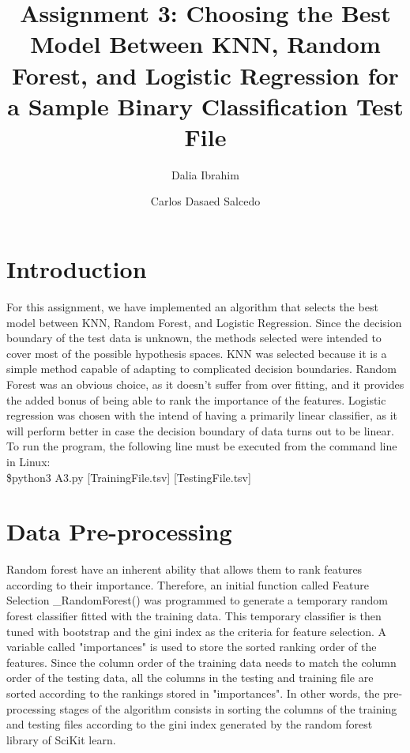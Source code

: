 \documentclass{article}
\author[1]{Dalia Ibrahim}
\author[2]{Carlos Dasaed Salcedo}
\affil[ ]{Studnet ID}
\affil[1]{201893217}
\affil[2]{201892008}
\begin{document}
  

\title{ Assignment 3: Choosing the Best Model Between KNN, Random Forest, and Logistic Regression for a Sample Binary Classification Test File}


\maketitle
 \section{Introduction}
For this assignment, we have implemented an algorithm that selects the best model between KNN, Random Forest, and Logistic Regression. Since the decision boundary of the test data is unknown, the methods selected were intended to cover most of the possible hypothesis spaces. KNN was selected because it is a simple method capable of adapting to complicated decision boundaries.  Random Forest was an obvious choice, as it doesn't suffer from over fitting, and it provides the added bonus of being able to rank the importance of the features. Logistic regression was chosen with the intend of having a primarily linear classifier, as it will perform better in case the decision boundary of data turns out to be linear. To run the program, the following line must be executed from the command line in Linux: \\
\$python3 A3.py [TrainingFile.tsv] [TestingFile.tsv]

\section{Data Pre-processing}
Random forest have an inherent ability that allows them to rank features according to their importance. Therefore, an initial function called Feature Selection \_RandomForest() was programmed to generate a temporary random forest classifier fitted with the training data. This temporary classifier is then tuned with bootstrap and the gini index as the criteria for feature selection. A variable called "importances" is used to store the sorted ranking order of the features. Since the column order of the training data needs to match the column order of the testing data, all the columns in the testing and training file are sorted according to the rankings stored in "importances". In other words, the pre-processing stages of the algorithm consists in sorting the columns of the training and testing files according to the gini index generated by the random forest library of SciKit learn.
\end{document}
